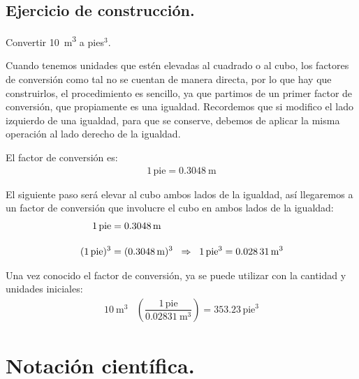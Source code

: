 \documentclass[14pt]{extarticle}
\begin{document}
\subsection{Ejercicio de construcción.}

Convertir \SI{10}{\cubic\meter} a pies${}^{3}$.

\vspace*{0.5cm}
Cuando tenemos unidades que estén elevadas al cuadrado o al cubo, los factores de conversión como tal no se cuentan de manera directa, por lo que hay que construirlos, el procedimiento es sencillo, ya que partimos de un primer factor de conversión, que propiamente es una igualdad. Recordemos que si modifico el lado izquierdo de una igualdad, para que se conserve, debemos de aplicar la misma operación al lado derecho de la igualdad.

El factor de conversión es:
\begin{align*}
1 \, \text{pie} = \SI{0.3048}{\meter}
\end{align*}

El siguiente paso será elevar al cubo ambos lados de la igualdad, así llegaremos a un factor de conversión que involucre el cubo en ambos lados de la igualdad:
\begin{eqnarray*}
\begin{aligned}
1 \, \text{pie} &= \SI{0.3048}{\meter} \\[1em] 
(1 \, \text{pie})^{3} &= (\SI{0.3048}{\meter})^{3}  \hspace{0.2cm} \Rightarrow \hspace{0.2cm} 1 \, \text{pie}^{3} = \SI{0.02831}{\cubic\meter}
\end{aligned}
\end{eqnarray*}

Una vez conocido el factor de conversión, ya se puede utilizar con la cantidad y unidades iniciales:
\begin{align*}
\SI{10}{\cubic\meter}  &\left( \dfrac{1 \, \text{pie}}{\SI{0.02831}{\cubic\meter}} \right) =  353.23 \, \text{pie}^{3}
\end{align*}

\section{Notación científica.}
\end{document}

